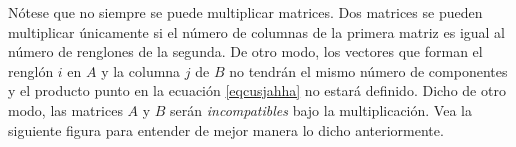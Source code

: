 \newpage

\begin{observation}
    Nótese que no siempre se puede multiplicar matrices. Dos matrices se pueden multiplicar únicamente si el número de columnas de la primera matriz es igual al número de renglones de la segunda. De otro modo, los vectores que forman el renglón $i$ en $A$ y la columna $j$ de $B$ no tendrán el mismo número de componentes y el producto punto en la ecuación \eqref{eqcusjahha} no estará definido. Dicho de otro modo, las matrices $A$ y $B$ serán \textit{incompatibles} bajo la multiplicación. Vea la siguiente figura para entender de mejor manera lo dicho anteriormente.
    \begin{center}
    \end{center}
\end{observation}

